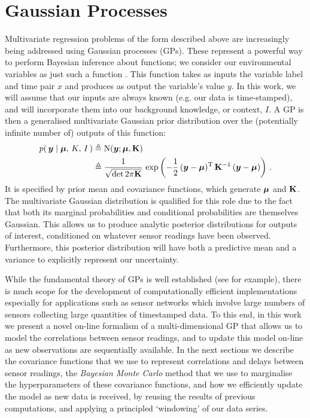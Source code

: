 \documentclass{acmtrans2m}
\begin{document}
\section{Gaussian Processes}\label{sec_gp}

\noindent Multivariate regression problems of the form described above are increasingly being  addressed using Gaussian processes (GPs). These represent a powerful way to perform Bayesian inference about functions; we consider our environmental variables as just such a function \cite{GPsBook}. This function takes as inputs the variable label and time pair $x$ and produces as output the variable's value $y$. In this work, we will assume that our inputs are always known (e.g. our data is time-stamped), and will incorporate them into our background knowledge, or context, $I$. A GP is then a generalised multivariate Gaussian prior distribution over the (potentially infinite number of) outputs of this function:
\begin{align*}%
\p{\vy}{\vmu,\,K,\,I} & \defequal \N{\vy}{\vmu}{\mat{K}}\nonumber\\
& \defequal\frac{1}{\sqrt{\det{2\pi\mat{K}}}}\,\exp \left(-\frac{1}{2}\,(\vy-\vmu)^\tr\,\mat{K}^{-1}\,(\vy-\vmu)\right)\,.
\end{align*}
It is specified by prior mean and covariance functions, which generate $\boldsymbol{\mu}$ and $\mathbf{K}$.
 The multivariate Gaussian distribution is qualified for this role due to the fact that both its marginal probabilities and conditional probabilities are themselves Gaussian. This allows us to produce analytic posterior distributions for outputs of interest, conditioned on whatever sensor readings have been observed. Furthermore, this posterior distribution will have both a predictive mean and a variance to explicitly represent our uncertainty.

While the fundamental theory of GPs is well established (see  for example), there is much scope for the development of computationally efficient implementations especially for applications such as sensor networks which involve large numbers of sensors collecting large quantities of timestamped data. To this end, in this work we present a novel on-line formalism of a multi-dimensional GP that allows us to model the correlations between sensor readings, and to update this model on-line as new observations are sequentially available. In the next sections we describe the covariance functions that we use to represent correlations and delays between sensor readings, the {\em Bayesian Monte Carlo} method that we use to marginalise the hyperparameters of these covariance functions, and how we efficiently update the model as new data is received, by reusing the results of previous computations, and applying a principled `windowing' of our data series.
\end{document}
